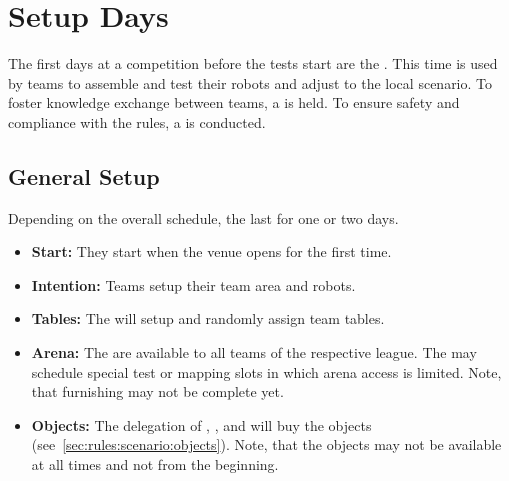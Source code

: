 \chapter{Setup Days}
\label{chap:setupdays}
The first days at a \RoboCup\AtHome{} competition before the tests start are the \SetupDays{}. This time is used by teams to assemble and test their robots and adjust to the local scenario. To foster knowledge exchange between teams, a \PS{} is held. To ensure safety and compliance with the rules, a \RobotInspection{} is conducted.


\section{General Setup}
\label{sec:setupdays:general}
Depending on the overall \RoboCup{} schedule, the \SetupDays{} last for one or two days.

\begin{itemize}
	\item \textbf{Start:} They start when the venue opens for the first time.
	\item \textbf{Intention:} Teams setup their team area and robots.
	\item \textbf{Tables:} The  will setup and randomly assign team tables.
	\item \textbf{Arena:} The \Arenas{} are available to all teams of the respective league. The  may schedule special test or mapping slots in which arena access is limited. Note, that furnishing may not be complete yet.
	\item \textbf{Objects:} The delegation of , ,  and  will buy the objects (see~\ref{sec:rules:scenario:objects}). Note, that the objects may not be available at all times and not from the beginning.
\end{itemize}

